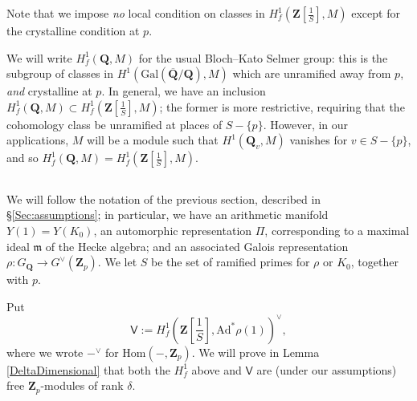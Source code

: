\documentclass[10pt]{amsart}
\newcommand{\Z}{\mathbf{Z}}
\newcommand{\Gal}{\mathrm{Gal}}
\newcommand{\Ad}{\mathrm{Ad}}
\newcommand{\Hom}{\mathrm{Hom}}
\newcommand{\Vinf}{\mathsf{V}}
\newcommand{\Q}{\mathbf{Q}}
\newcommand{\ramprimes}{S}
\theoremstyle{remark}
\begin{document}
Note that we impose {\em no} local condition on  classes in $H^1_f(\Z[\frac{1}{S}], M)$ except  for the crystalline condition  at $p$. 
 
 We will write $H^1_f(\Q, M)$ for the usual Bloch--Kato Selmer group: this is 
the subgroup of classes in $H^1(\Gal(\overline{\Q}/\Q), M)$ which
are unramified away from $p$, {\em and} crystalline at $p$.
In general, we have an inclusion $H^1_f(\Q, M) \subset H^1_f(\Z[\frac{1}{S}], M)$;
the former is more restrictive, requiring that the cohomology class be unramified
at places of $\ramprimes - \{p\}$. However, in our applications, 
$M$ will be a module such that $H^1(\Q_v, M)$ vanishes for $v \in \ramprimes - \{p\}$,
and so $H^1_f(\Q, M) = H^1_f(\Z[\frac{1}{S}], M)$. 
 



\subsection{}  \label{mMain}

We will follow the notation of the previous section, described in \S \ref{Sec:assumptions};
in particular, we have an arithmetic manifold $Y(1) =Y(K_0)$, an automorphic
representation $\Pi$,  corresponding to a maximal ideal $\mathfrak{m}$ of the Hecke algebra;
and an associated Galois representation $\rho: G_{\Q} \rightarrow G^{\vee}(\Z_p)$. 
We let $\ramprimes$ be the set of ramified primes for $\rho$ or $K_0$, together with $p$.
 
\index{$\Vinf$} 
 Put  \begin{equation} \label{Vdef} \mathsf{V} :=   H^1_f(\Z[\frac{1}{\ramprimes}], \Ad^* \rho(1))^{\vee},\end{equation}
where  we wrote  $-^{\vee}$ for $\Hom(-, \Z_p)$. 
We will prove in Lemma \ref{DeltaDimensional} that both the $H^1_f$ above and  $\mathsf{V}$   are (under our assumptions)   free $\Z_p$-modules of rank $\delta$.
\end{document}
